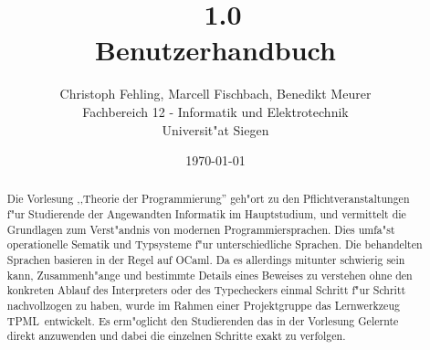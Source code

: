 \documentclass[a4paper,fleqn,latin1,twoside,12pt]{report}
\title{{\Huge \TPML\ 1.0}\\Benutzerhandbuch}
\author{{\Large Christoph Fehling, Marcell Fischbach, Benedikt Meurer}\\Fachbereich 12 - Informatik und Elektrotechnik\\Universit"at Siegen}
\date{\small\today}
\newcommand{\TPML}{\textsf{\textmd{TPML}}}
\begin{document}
\maketitle

\begin{abstract}
Die Vorlesung ,,Theorie der Programmierung'' geh"ort zu den Pflichtveranstaltungen f"ur Studierende der Angewandten
Informatik im Hauptstudium, und vermittelt die Grundlagen zum Verst"andnis von modernen Programmiersprachen. Dies
umfa"st operationelle Sematik und Typsysteme f"ur unterschiedliche Sprachen. Die behandelten Sprachen basieren
in der Regel auf OCaml. Da es allerdings mitunter schwierig sein kann, Zusammenh"ange und bestimmte Details eines
Beweises zu verstehen ohne den konkreten Ablauf des Interpreters oder des Typecheckers einmal Schritt f"ur Schritt
nachvollzogen zu haben, wurde im Rahmen einer Projektgruppe das Lernwerkzeug \TPML\ entwickelt. Es erm"oglicht den
Studierenden das in der Vorlesung Gelernte direkt anzuwenden und dabei die einzelnen Schritte exakt zu verfolgen.
\end{abstract}

\tableofcontents
\newpage









\begin{appendix}

\end{appendix}
\end{document}
